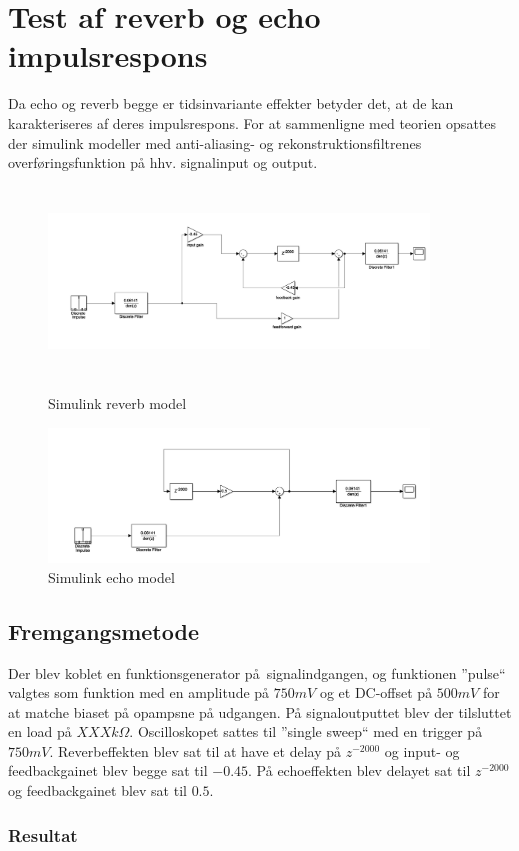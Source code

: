 \chapter{Test af reverb og echo impulsrespons}
Da echo og reverb begge er tidsinvariante effekter betyder det, at de kan karakteriseres af deres impulsrespons.
For at sammenligne med teorien opsattes der simulink modeller med anti-aliasing- og rekonstruktionsfiltrenes overføringsfunktion på hhv. signalinput og output.
\begin{figure}[!ht]
	\centering
	\begin{minipage}{0.50\textwidth}
		\centering
		\includegraphics[width=0.9\textwidth, height=5cm]{billeder/reverb-testopsaetning.png}
		\caption{Simulink reverb model}
		\end{minipage}\hfill
	\begin{minipage}{0.50\textwidth}
		\centering
		\includegraphics[width=0.9\textwidth, height=5 cm]{billeder/echo-testopsaetning.png}
		\caption{Simulink echo model}
		\end{minipage}
\end{figure}

\section{Fremgangsmetode}
Der blev koblet en funktionsgenerator på signalindgangen, og funktionen ''pulse`` valgtes som funktion med en amplitude på $750\si{mV}$ og et DC-offset på $500\si{mV}$ for at matche biaset på opampsne på udgangen. %
På signaloutputtet blev der tilsluttet en load på $XXX\si{k\Omega}$. 
Oscilloskopet sattes til ''single sweep`` med en trigger på $750\si{mV}$.
Reverbeffekten blev sat til at have et delay på $z^{-2000}$ og input- og feedbackgainet blev begge sat til $-0.45$.\newline
På echoeffekten blev delayet sat til $z^{-2000}$ og feedbackgainet blev sat til $0.5$.
\subsection{Resultat}
